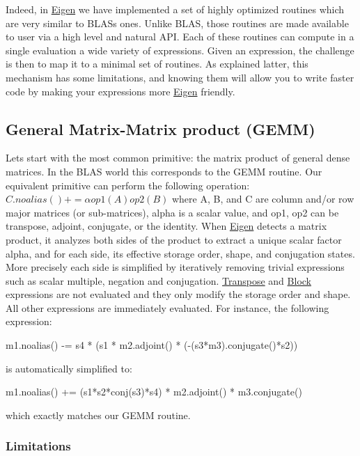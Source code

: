 Indeed, in \hyperlink{namespace_eigen}{Eigen} we have implemented a set of highly optimized routines which are very similar to B\+L\+AS\textquotesingle{}s ones. Unlike B\+L\+AS, those routines are made available to user via a high level and natural A\+PI. Each of these routines can compute in a single evaluation a wide variety of expressions. Given an expression, the challenge is then to map it to a minimal set of routines. As explained latter, this mechanism has some limitations, and knowing them will allow you to write faster code by making your expressions more \hyperlink{namespace_eigen}{Eigen} friendly.\hypertarget{_topic_writing_efficient_product_expression_GEMM}{}\subsection{General Matrix-\/\+Matrix product (\+G\+E\+M\+M)}\label{_topic_writing_efficient_product_expression_GEMM}
Let\textquotesingle{}s start with the most common primitive\+: the matrix product of general dense matrices. In the B\+L\+AS world this corresponds to the G\+E\+MM routine. Our equivalent primitive can perform the following operation\+: $ C.noalias() += \alpha op1(A) op2(B) $ where A, B, and C are column and/or row major matrices (or sub-\/matrices), alpha is a scalar value, and op1, op2 can be transpose, adjoint, conjugate, or the identity. When \hyperlink{namespace_eigen}{Eigen} detects a matrix product, it analyzes both sides of the product to extract a unique scalar factor alpha, and for each side, its effective storage order, shape, and conjugation states. More precisely each side is simplified by iteratively removing trivial expressions such as scalar multiple, negation and conjugation. \hyperlink{group___core___module_class_eigen_1_1_transpose}{Transpose} and \hyperlink{group___core___module_class_eigen_1_1_block}{Block} expressions are not evaluated and they only modify the storage order and shape. All other expressions are immediately evaluated. For instance, the following expression\+: 
\begin{DoxyCode}
m1.noalias() -= s4 * (s1 * m2.adjoint() * (-(s3*m3).conjugate()*s2))  
\end{DoxyCode}
 is automatically simplified to\+: 
\begin{DoxyCode}
m1.noalias() += (s1*s2*conj(s3)*s4) * m2.adjoint() * m3.conjugate() 
\end{DoxyCode}
 which exactly matches our G\+E\+MM routine.\hypertarget{_topic_writing_efficient_product_expression_GEMM_Limitations}{}\subsubsection{Limitations}\label{_topic_writing_efficient_product_expression_GEMM_Limitations}
